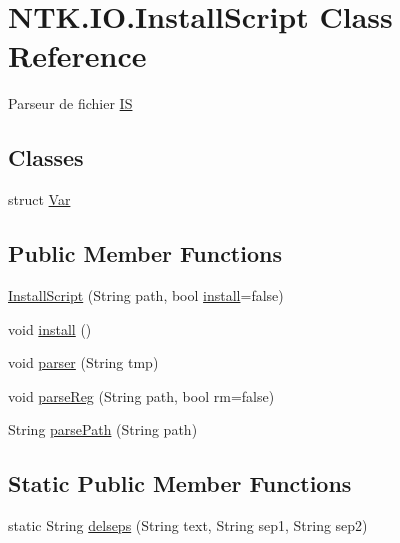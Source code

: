 \hypertarget{class_n_t_k_1_1_i_o_1_1_install_script}{}\section{N\+T\+K.\+I\+O.\+Install\+Script Class Reference}
\label{class_n_t_k_1_1_i_o_1_1_install_script}


Parseur de fichier \mbox{\hyperlink{namespace_n_t_k_1_1_i_o_1_1_i_s}{IS}}  


\subsection*{Classes}
\begin{DoxyCompactItemize}
\item 
struct \mbox{\hyperlink{struct_n_t_k_1_1_i_o_1_1_install_script_1_1_var}{Var}}
\end{DoxyCompactItemize}
\subsection*{Public Member Functions}
\begin{DoxyCompactItemize}
\item 
\mbox{\hyperlink{class_n_t_k_1_1_i_o_1_1_install_script_ace111e02426ee37dd32b05817ab0d391}{Install\+Script}} (String path, bool \mbox{\hyperlink{class_n_t_k_1_1_i_o_1_1_install_script_a9be428a95b4e00ef064e44c40adfc9d6}{install}}=false)
\item 
void \mbox{\hyperlink{class_n_t_k_1_1_i_o_1_1_install_script_a9be428a95b4e00ef064e44c40adfc9d6}{install}} ()
\item 
void \mbox{\hyperlink{class_n_t_k_1_1_i_o_1_1_install_script_afce993acab2391c4bd766d47adbc116d}{parser}} (String tmp)
\item 
void \mbox{\hyperlink{class_n_t_k_1_1_i_o_1_1_install_script_a3fcedaaa50f635f74b6e10d9db983f61}{parse\+Reg}} (String path, bool rm=false)
\item 
String \mbox{\hyperlink{class_n_t_k_1_1_i_o_1_1_install_script_a98769cc4b2984c43f01ec360dc7c8a25}{parse\+Path}} (String path)
\end{DoxyCompactItemize}
\subsection*{Static Public Member Functions}
\begin{DoxyCompactItemize}
\item 
static String \mbox{\hyperlink{class_n_t_k_1_1_i_o_1_1_install_script_a7d5e0705e0212b34422131db484adea9}{delseps}} (String text, String sep1, String sep2)
\end{DoxyCompactItemize}


